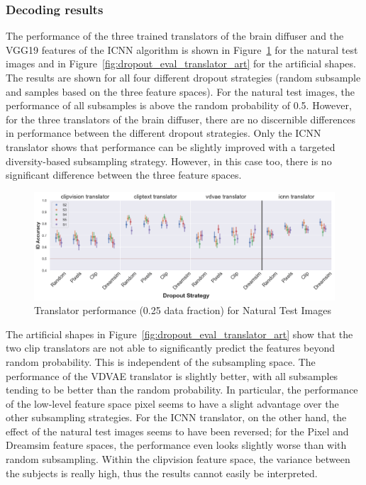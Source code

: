 \subsubsection{Decoding results}
The performance of the three trained translators of the brain diffuser and the VGG19 features of the ICNN algorithm is shown in Figure~\ref{fig:dropout_eval_translator_test} for the natural test images and in Figure~\ref{fig:dropout_eval_translator_art} for the artificial shapes. The results are shown for all four different dropout strategies (random subsample and samples based on the three feature spaces). For the natural test images, the performance of all subsamples is above the random probability of 0.5. However, for the three translators of the brain diffuser, there are no discernible differences in performance between the different dropout strategies. Only the ICNN translator shows that performance can be slightly improved with a targeted diversity-based subsampling strategy. However, in this case too, there is no significant difference between the three feature spaces.

\begin{figure}[ht]
  \centering
  \includegraphics[width=1\textwidth]{plots/dropout_eval_translator_test.png}
  \caption{Translator performance (0.25 data fraction) for Natural Test Images}\label{fig:dropout_eval_translator_test}
\end{figure}

The artificial shapes in Figure~\ref{fig:dropout_eval_translator_art} show that the two clip translators are not able to significantly predict the features beyond random probability. This is independent of the subsampling space. The performance of the VDVAE translator is slightly better, with all subsamples tending to be better than the random probability. In particular, the performance of the low-level feature space pixel seems to have a slight advantage over the other subsampling strategies. For the ICNN translator, on the other hand, the effect of the natural test images seems to have been reversed; for the Pixel and Dreamsim feature spaces, the performance even looks slightly worse than with random subsampling. Within the clipvision feature space, the variance between the subjects is really high, thus the results cannot easily be interpreted.

